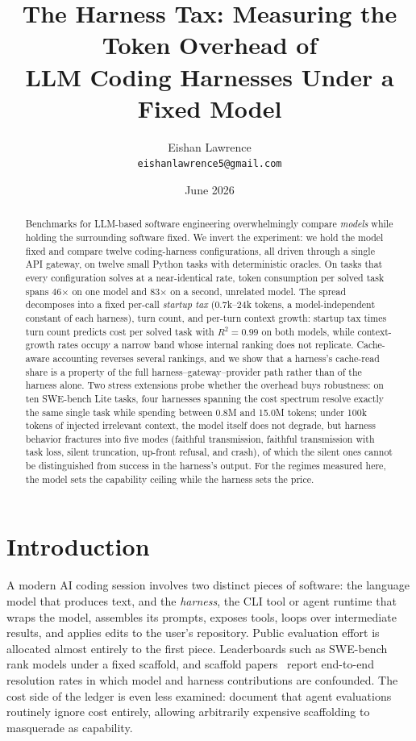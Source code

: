 \documentclass[11pt]{article}
\title{\textbf{The Harness Tax: Measuring the Token Overhead of\\LLM Coding Harnesses Under a Fixed Model}}
\author{Eishan Lawrence\\\texttt{eishanlawrence5@gmail.com}}
\date{June 2026}
\begin{document}
\maketitle

\begin{abstract}
Benchmarks for LLM-based software engineering overwhelmingly compare \emph{models} while holding the surrounding software fixed. We invert the experiment: we hold the model fixed and compare twelve coding-harness configurations, all driven through a single API gateway, on twelve small Python tasks with deterministic oracles. On tasks that every configuration solves at a near-identical rate, token consumption per solved task spans 46$\times$ on one model and 83$\times$ on a second, unrelated model. The spread decomposes into a fixed per-call \emph{startup tax} (0.7k--24k tokens, a model-independent constant of each harness), turn count, and per-turn context growth: startup tax times turn count predicts cost per solved task with $R^2 = 0.99$ on both models, while context-growth rates occupy a narrow band whose internal ranking does not replicate. Cache-aware accounting reverses several rankings, and we show that a harness's cache-read share is a property of the full harness--gateway--provider path rather than of the harness alone. Two stress extensions probe whether the overhead buys robustness: on ten SWE-bench Lite tasks, four harnesses spanning the cost spectrum resolve exactly the same single task while spending between 0.8M and 15.0M tokens; under 100k tokens of injected irrelevant context, the model itself does not degrade, but harness behavior fractures into five modes (faithful transmission, faithful transmission with task loss, silent truncation, up-front refusal, and crash), of which the silent ones cannot be distinguished from success in the harness's output. For the regimes measured here, the model sets the capability ceiling while the harness sets the price.
\end{abstract}

\section{Introduction}
\label{sec:intro}

A modern AI coding session involves two distinct pieces of software: the language model that produces text, and the \emph{harness}, the CLI tool or agent runtime that wraps the model, assembles its prompts, exposes tools, loops over intermediate results, and applies edits to the user's repository. Public evaluation effort is allocated almost entirely to the first piece. Leaderboards such as SWE-bench~\citep{jimenez2024swebench} rank models under a fixed scaffold, and scaffold papers~\citep{yang2024sweagent,wang2024openhands} report end-to-end resolution rates in which model and harness contributions are confounded. The cost side of the ledger is even less examined: \citet{kapoor2024agents} document that agent evaluations routinely ignore cost entirely, allowing arbitrarily expensive scaffolding to masquerade as capability.
\end{document}
